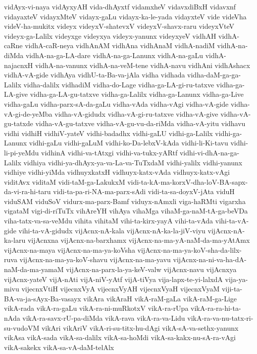 {vidAyx-vi-naya
vidAyxyAH
vida-dhAyxtf
vidamxheV
vidavxdiBxH
vidavxnf
vidayaxteV
vidayxMteV
vidayx-gaLu
vidayx-ka-le-yada
vidayxteV
vide
videVha
videV-ha-mukitx
videyx
videyxV-shatevxV
videyxV-shavx-raru
videyxVteV
videyx-ga-Lalilx
videyxge
videyxya
videyx-yanunx
videyxyeV
vidhAH
vidhA-caRne
vidhA-caR-neya
vidhAnAM
vidhAna
vidhAnaM
vidhA-nadiM
vidhA-na-diMda
vidhA-na-ga-LA-dare
vidhA-na-ga-Lanunx
vidhA-na-gaLu
vidhA-najacnxH
vidhA-na-vanunx
vidhA-na-veM-tene
vidhA-navu
vidhAni
vidhAshacx
vidhA-vA-gide
vidhAya
vidhU-ta-Ba-va-jAla
vidha
vidhada
vidha-daM-ga-ga-Lalilx
vidha-dalilx
vidhadiM
vidha-do-Lage
vidha-ga-LA-gi-ru-tatxve
vidha-ga-LA-give
vidha-ga-LA-gu-tatxve
vidha-ga-Lalilx
vidha-ga-Lanunx
vidha-ga-Live
vidha-gaLu
vidha-parx-sA-da-gaLu
vidha-vAda
vidha-vAgi
vidha-vA-gide
vidha-vA-gi-de-yeMba
vidha-vA-gidudx
vidha-vA-gi-ru-tatxve
vidha-vA-give
vidha-vA-gu-tatxde
vidha-vA-gu-tatxve
vidha-vA-gu-vu-da-riMda
vidha-vA-yitu
vidhavu
vidhi
vidhiH
vidhiV-yateV
vidhi-badadhx
vidhi-gaLU
vidhi-ga-Lalilx
vidhi-ga-Lanunx
vidhi-gaLu
vidhi-gaLuM
vidhi-ko-Da-lebxV-kAda
vidhi-li-Ki-tavu
vidhi-li-pi-yeMdu
vidhinA
vidhi-va-tAtxgi
vidhi-va-tukx-yARtf
vidhi-vi-dhA-na-ga-Lalilx
vidhiya
vidhi-ya-dhAyx-ya-va-La-va-TuTxdaM
vidhi-yalilx
vidhi-yanunx
vidhiye
vidhi-yiMda
vidhuyxkatxH
vidhuyx-katx-vAda
vidhuyx-katx-vAgi
viditAvx
viditaM
vidi-taM-ga-LakukxM
vidi-ta-kA-ma-korxV-dha-loV-BA-sapx-da-vi-ra-hi-taru
vidi-ta-pa-ri-NA-ma-parx-sAdi
vidi-ta-sa-doyxV-jAta
viduH
viduSAM
viduSoV
vidurx-ma-parx-Bamf
viduyx-nAmxli
viga-haRMti
vigarxha
vigataM
vigi-di-riTuTx
vihAreYH
vihAya
vihaMga
vihaM-ga-naM-tA-ga-beVDa
viha-tatx-va-sa-veMdu
vihita
vihitaM
vihi-ta-kirx-yayA
vihi-ta-vAda
vihi-ta-vA-gide
vihi-ta-vA-gidudx
vijAcnx-nA-kala
vijAcnx-nA-ka-la-jiV-viyu
vijAcnx-nA-ka-laru
vijAcnxna
vijAcnx-na-barxhamx
vijAcnx-na-ma-yA-naM-da-ma-yAtAmx
vijAcnx-na-maya
vijAcnx-na-ma-ya-koVsha
vijAcnx-na-ma-ya-koV-sha-da-lilx-ruva
vijAcnx-na-ma-ya-koV-shavu
vijAcnx-na-ma-yavu
vijAcnx-na-ni-va-ha-dA-naM-da-ma-yamaM
vijAcnx-na-parx-la-ya-keV-valw
vijAcnx-navu
vijAcnxya
vijAcnx-yateV
vijA-nAti
vijA-niV-yAtf
vijA-tiVya
vija-lapx-te-yi-lalxdA
vija-ya-mivu
vijecnxVtiH
vijecnxVyA
vijecnxVyAH
vijecnxVyaH
vijecnxVyaM
viji-ta-BA-va-ja-sAyx-Ba-vasayx
vikAra
vikAraH
vikA-raM-gaLa
vikA-raM-ga-Lige
vikA-rada
vikA-ra-gaLu
vikA-ra-ni-muRkotxV
vikA-ra-rUpa
vikA-ra-ra-hi-ta-nAda
vikA-ra-savx-rU-pa-diMda
vikA-rava
vikA-ra-va-Lidu
vikA-ra-va-nu-tatx-ri-su-vudoVM
vikAri
vikAriV
vikA-ri-su-titx-hu-dAgi
vikA-sA-va-sethx-yanunx
vikAsa
vikA-sada
vikA-sa-dalilx
vikA-sa-hoMdi
vikA-sa-kakx-nu-sA-ra-vAgi
vikA-sakekx
vikA-sa-vA-daM-telAlx
}
